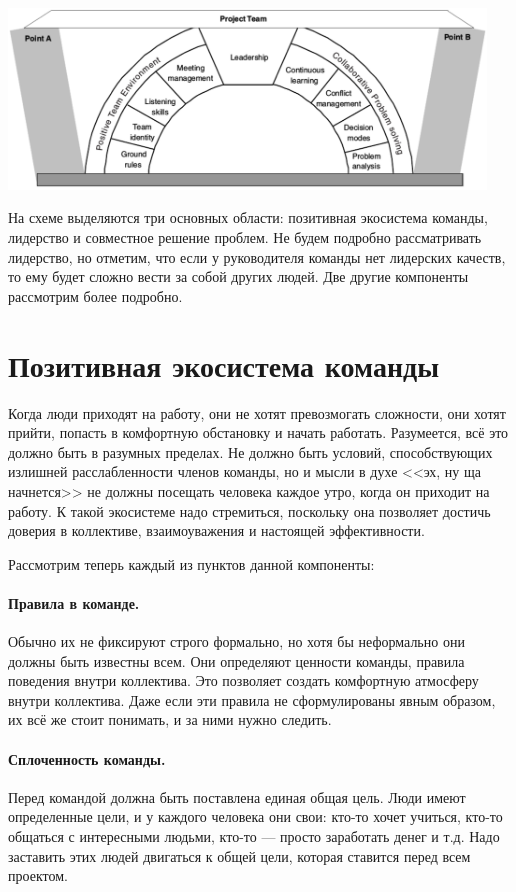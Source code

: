 \documentclass{../../text-style}
\begin{document}
\begin{center}
    \includegraphics[width=0.95\textwidth]{successfulTeamComponents.png}
\end{center}

На схеме выделяются три основных области: позитивная экосистема команды, лидерство и совместное решение проблем. Не будем подробно рассматривать лидерство, но отметим, что если у руководителя команды нет лидерских качеств, то ему будет сложно вести за собой других людей. Две другие компоненты рассмотрим более подробно.

\section{Позитивная экосистема команды}

Когда люди приходят на работу, они не хотят превозмогать сложности, они хотят прийти, попасть в комфортную обстановку и начать работать. Разумеется, всё это должно быть в разумных пределах. Не должно быть условий, способствующих излишней расслабленности членов команды, но и мысли в духе <<эх, ну ща начнется>> не должны посещать человека каждое утро, когда он приходит на работу. К такой экосистеме надо стремиться, поскольку она позволяет достичь доверия в коллективе, взаимоуважения и настоящей эффективности.

Рассмотрим теперь каждый из пунктов данной компоненты:

\paragraph*{Правила в команде.} Обычно их не фиксируют строго формально, но хотя бы неформально они должны быть известны всем. Они определяют ценности команды, правила поведения внутри коллектива. Это позволяет создать комфортную атмосферу внутри коллектива. Даже если эти правила не сформулированы явным образом, их всё же стоит понимать, и за ними нужно следить.

\paragraph*{Сплоченность команды.} Перед командой должна быть поставлена единая общая цель. Люди имеют  определенные цели, и у каждого человека они свои: кто-то хочет учиться, кто-то общаться с интересными людьми, кто-то --- просто заработать денег и т.д. Надо заставить этих людей двигаться к общей цели, которая ставится перед всем проектом.
\end{document}
